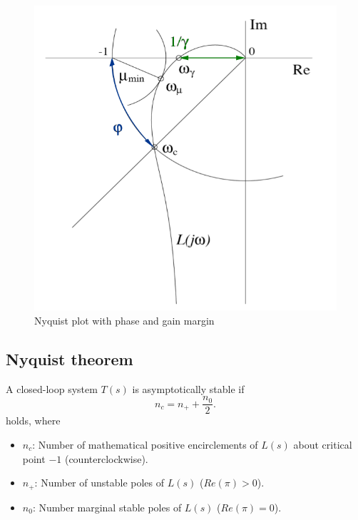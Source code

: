 \documentclass[a4paper,12 pt]{article}
\numberwithin{equation}{section}
\theoremstyle{definition}
\theoremstyle{remark}
\theoremstyle{definition}
\theoremstyle{definition}
\theoremstyle{definition}
\theoremstyle{remark}
\begin{document}
\begin{figure}[h!]
\begin{center}
\includegraphics[width=0.65\columnwidth]{margins2.png}
\caption{Nyquist plot with phase and gain margin}
\label{fig:margins2}
\end{center}
\end{figure}

\newpage
 \subsection{Nyquist theorem}
A closed-loop system $T(s)$ is asymptotically stable if
\begin{equation}
n_c=n_+ +\frac{n_0}{2}.
\end{equation}
holds, where
\begin{itemize}
\item $n_c$: Number of mathematical positive encirclements of $L(s)$ about critical point $-1$ (counterclockwise).
\item $n_+$: Number of unstable poles of $L(s)$ ($Re(\pi)>0$).
\item $n_0$: Number marginal stable poles of $L(s)$ ($Re(\pi)=0$).

\end{itemize}
\end{document}
